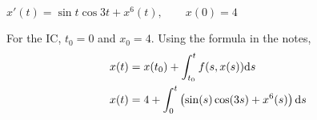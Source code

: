 $x'(t) = \sin t \cos 3t + x^6 (t), \qquad x(0) = 4$

\nl For the IC, $t_0 = 0$ and $x_0 = 4$. Using the formula in the notes,
\begin{align*}
    x(t) &= x(t_0) + \int_{t_0}^t f(s, x(s)) \dd s \\
    x(t) &= 4 + \int_0^t \pars{\sin(s) \cos(3s) + x^6 (s)} \dd s 
\end{align*}